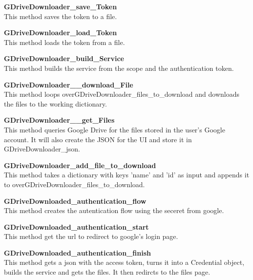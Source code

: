 \textbf{GDriveDownloader\_save\_Token} \\
This method saves the token to a file.

\textbf{GDriveDownloader\_load\_Token} \\
This method loads the token from a file.

\textbf{GDriveDownloader\_build\_Service} \\
This method builds the service from the scope and the authentication token.

\textbf{GDriveDownloader\_\_download\_File} \\
This method loops overGDriveDownloader\_files\_to\_download and downloads the files to the working dictionary. 

\textbf{GDriveDownloader\_\_get\_Files} \\
This method queries Google Drive for the files stored in the user's Google account. It will also create the JSON for the UI and store it in GDriveDownloader\_json.   

\textbf{GDriveDownloader\_add\_file\_to\_download} \\
This method takes a dictionary with keys 'name' and 'id' as input and appends it to overGDriveDownloader\_files\_to\_download.

\textbf{GDriveDownloaded\_authentication\_flow} \\
This method creates the autentication flow using the seceret from google.

\textbf{GDriveDownloaded\_authentication\_start} \\
This method get the url to redirect to google's login page.

\textbf{GDriveDownloaded\_authentication\_finish} \\
This method gets a json with the access token, turns it into a Credential object, builds the service and gets the files. It then redircts to the files page. 
